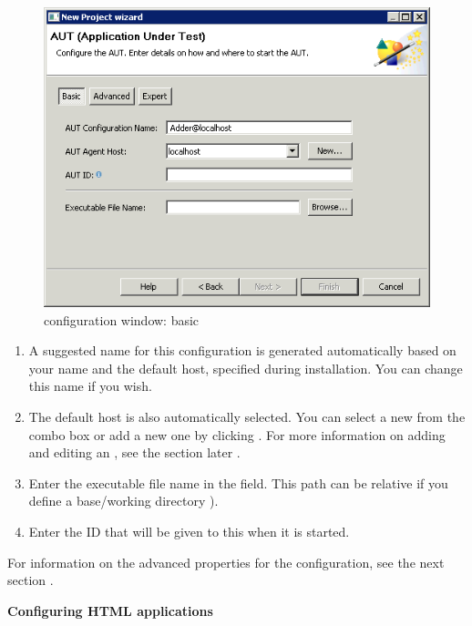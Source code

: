 \begin{figure}[h]
\begin{center}
\includegraphics{Tasks/AUTs/PS/autconfigwindow_basic}
\caption{\gdaut configuration window: basic}
\label{autconfigbasic}
\end{center}
\end{figure}

\begin{enumerate}
\item A suggested name for this \gdaut{} configuration is generated automatically based on your \gdaut{} name and the default \gdserver host, specified during installation. You can change this name if you wish. 
\item The default \gdserver host is also automatically selected. You can select a new \gdserver from the combo box or add a new one by clicking . For more information on adding and editing an \gdserver, see the  section later .

\item Enter the executable file name in the  field. This path can be relative if you define a base/working directory ).
\item Enter the \gdaut{} ID that will be given to this \gdaut{} when it is started.  
\end{enumerate}
For information on the advanced properties for the \gdaut{} configuration, see the next section . 

\textbf{Configuring HTML applications}\\

